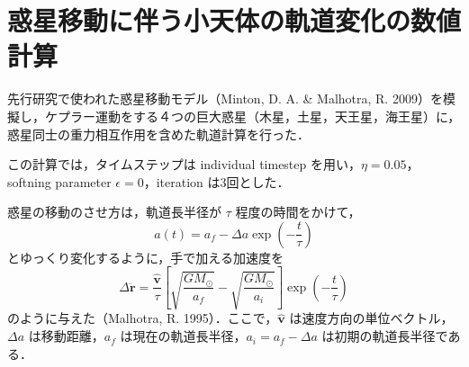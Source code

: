 \documentclass[11pt,a4paper,oneside,onecolumn]{jreport}
\begin{document}
\section{惑星移動に伴う小天体の軌道変化の数値計算}
先行研究で使われた惑星移動モデル（Minton, D. A. \& Malhotra, R. 2009）を模擬し，ケプラー運動をする４つの巨大惑星（木星，土星，天王星，海王星）に，惑星同士の重力相互作用を含めた軌道計算を行った．

この計算では，タイムステップは individual timestep を用い，$\eta = 0.05$，softning parameter $\epsilon = 0$，iteration は3回とした．

惑星の移動のさせ方は，軌道長半径が $\tau$ 程度の時間をかけて，
\begin{equation}
a (t) = a_f - \Delta a \exp \left( - \frac{t}{\tau} \right) \label{eq:a(t)}
\end{equation}
とゆっくり変化するように，手で加える加速度を
\begin{equation}
\Delta \ddot{\bm r} = \frac{\hat{{\bm v}}}{\tau} \left[ \sqrt{\frac{G M_{\odot}}{a_f}} - \sqrt{\frac{G M_{\odot}}{a_i}} \right] \exp \left(- \frac{t}{\tau} \right) \label{eq:delta_rddot}
\end{equation}
のように与えた（Malhotra, R. 1995）．ここで，$\hat{{\bm v}}$ は速度方向の単位ベクトル，$\Delta a$ は移動距離，$a_f$ は現在の軌道長半径，$a_i = a_f - \Delta a$ は初期の軌道長半径である．
\end{document}
